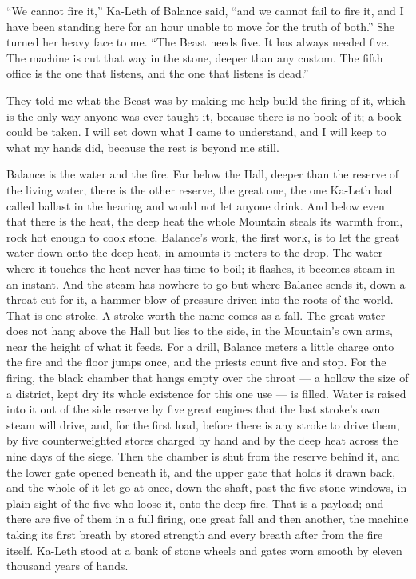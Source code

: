 ``We cannot fire it,'' Ka-Leth of Balance said, ``and we cannot fail to fire it, and I have been standing here for an hour unable to move for the truth of both.'' She turned her heavy face to me. ``The Beast needs five. It has always needed five. The machine is cut that way in the stone, deeper than any custom. The fifth office is the one that listens, and the one that listens is dead.''\par

\ornament

They told me what the Beast was by making me help build the firing of it, which is the only way anyone was ever taught it, because there is no book of it; a book could be taken. I will set down what I came to understand, and I will keep to what my hands did, because the rest is beyond me still.\par

Balance is the water and the fire. Far below the Hall, deeper than the reserve of the living water, there is the other reserve, the great one, the one Ka-Leth had called ballast in the hearing and would not let anyone drink. And below even that there is the heat, the deep heat the whole Mountain steals its warmth from, rock hot enough to cook stone. Balance's work, the first work, is to let the great water down onto the deep heat, in amounts it meters to the drop. The water where it touches the heat never has time to boil; it flashes, it becomes steam in an instant. And the steam has nowhere to go but where Balance sends it, down a throat cut for it, a hammer-blow of pressure driven into the roots of the world. That is one stroke. A stroke worth the name comes as a fall. The great water does not hang above the Hall but lies to the side, in the Mountain's own arms, near the height of what it feeds. For a drill, Balance meters a little charge onto the fire and the floor jumps once, and the priests count five and stop. For the firing, the black chamber that hangs empty over the throat --- a hollow the size of a district, kept dry its whole existence for this one use --- is filled. Water is raised into it out of the side reserve by five great engines that the last stroke's own steam will drive, and, for the first load, before there is any stroke to drive them, by five counterweighted stores charged by hand and by the deep heat across the nine days of the siege. Then the chamber is shut from the reserve behind it, and the lower gate opened beneath it, and the upper gate that holds it drawn back, and the whole of it let go at once, down the shaft, past the five stone windows, in plain sight of the five who loose it, onto the deep fire. That is a payload; and there are five of them in a full firing, one great fall and then another, the machine taking its first breath by stored strength and every breath after from the fire itself. Ka-Leth stood at a bank of stone wheels and gates worn smooth by eleven thousand years of hands.\par

